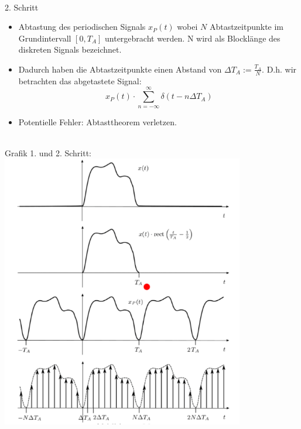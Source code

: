 \documentclass[12pt,a4paper]{scrartcl}
\begin{document}
 \noindent \\ 2. Schritt
 \begin{itemize}
  \item Abtastung des periodischen Signals $x_P (t)$ wobei $N$ Abtastzeitpunkte im Grundintervall $[0, T_A]$ untergebracht werden. N wird als Blocklänge des diskreten Signals bezeichnet. 
  \item Dadurch haben die Abtastzeitpunkte einen Abstand von $\Delta T_A := \frac{T_A}{N}$. D.h. wir betrachten das abgetastete Signal: $$x_P (t) \cdot \sum_{n = -\infty}^{\infty} \delta(t - n \Delta T_A)$$
  \item Potentielle Fehler: Abtasttheorem verletzen.
\end{itemize}
\noindent\\ Grafik 1. und 2. Schritt:\\
\includegraphics[height = 12cm]{Pictures/Schritt1.png}
\end{document}
